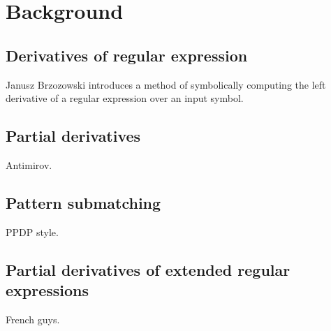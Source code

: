 \chapter{Background}

\section{Derivatives of regular expression}

Janusz Brzozowski introduces a method of symbolically computing the left
derivative of a regular expression over an input symbol.

\section{Partial derivatives}

Antimirov.

\section{Pattern submatching}

PPDP style.

\section{Partial derivatives of extended regular expressions}

French guys.


